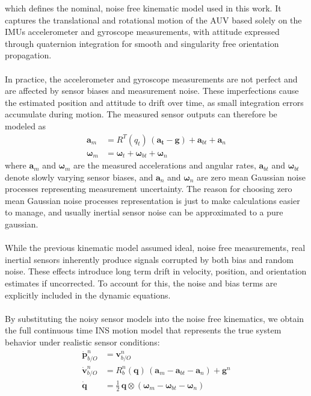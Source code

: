 which defines the nominal, noise free kinematic model used in this work. It captures the translational and rotational motion of the AUV based solely on the IMUs accelerometer and gyroscope measurements, with attitude expressed through quaternion integration for smooth and singularity free orientation propagation.
\\ \\
In practice, the accelerometer and gyroscope measurements are not perfect and are affected by sensor biases and measurement noise. These imperfections cause the estimated position and attitude to drift over time, as small integration errors accumulate during motion. The measured sensor outputs can therefore be modeled as
$$
\begin{aligned}
    \mathbf{a}_m &= R^{T}(q_t)\,(\mathbf{a_t} - \mathbf{g}) + \mathbf{a}_{bt} + \mathbf{a}_{n} \\
    \boldsymbol{\omega}_m &= \boldsymbol{\omega}_t + \mathbf{\omega}_{bt} + \mathbf{\omega}_{n}
\end{aligned}
$$
where $\mathbf{a}_m$ and $\boldsymbol{\omega}_m$ are the measured accelerations and angular rates, $\mathbf{a}_{bt}$ and $\mathbf{\omega}_{bt}$ denote slowly varying sensor biases, and $\mathbf{a}_{n}$ and $\mathbf{\omega}_{n}$ are zero mean Gaussian noise processes representing measurement uncertainty. The reason for choosing zero mean Gaussian noise processes representation is just to make calculations easier to manage, and usually inertial sensor noise can be approximated to a pure gaussian.  
\\ \\
While the previous kinematic model assumed ideal, noise free measurements, real inertial sensors inherently produce signals corrupted by both bias and random noise. These effects introduce long term drift in velocity, position, and orientation estimates if uncorrected. To account for this, the noise and bias terms are explicitly included in the dynamic equations.  
\\ \\
By substituting the noisy sensor models into the noise free kinematics, we obtain the full continuous time INS motion model that represents the true system behavior under realistic sensor conditions:
$$
\begin{aligned}
    \dot{\mathbf{p}}_{b/O}^{n} &= \mathbf{v}_{b/O}^{n} \\
    \dot{\mathbf{v}}_{b/O}^{n} &= R_b^n(\mathbf{q})\,(\mathbf{a}_m - \mathbf{a}_{bt} - \mathbf{a}_n) + \mathbf{g}^n \\
    \dot{\mathbf{q}} &= \tfrac{1}{2}\,\mathbf{q} \otimes (\boldsymbol{\omega}_m - \mathbf{\omega}_{bt} - \mathbf{\omega}_n)
\end{aligned}
$$
